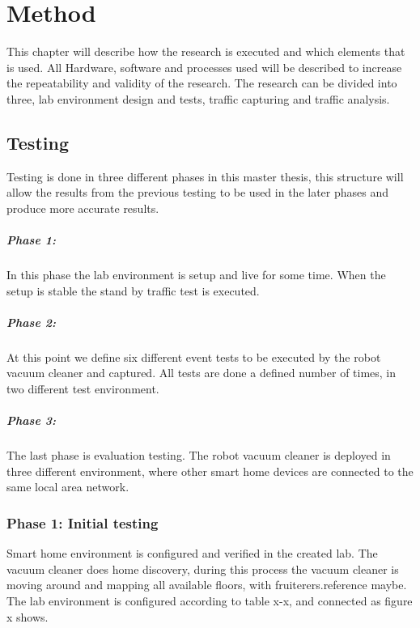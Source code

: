 \chapter*{Method}

This chapter will describe how the research is executed and which elements that is used. All Hardware, software and processes used will be described to increase the repeatability and validity of the research. The research can be divided into three, lab environment design and tests, traffic capturing and traffic analysis.

\section{Testing}
Testing is done in three different phases in this master thesis, this structure will allow the results from the previous testing to be used in the later phases and produce more accurate results.

    \paragraph{Phase 1: } In this phase the lab environment is setup and live for some time. When the setup is stable the stand by traffic test is executed. 

    \paragraph{Phase 2: } At this point we define six different event tests to be executed by the robot vacuum cleaner and captured. All tests are done a defined number of times, in two different test environment. 

    \paragraph{Phase 3: } The last phase is evaluation testing. The robot vacuum cleaner is deployed in three different environment, where other smart home devices are connected to the same local area network. 

\subsection{Phase 1: Initial testing}
Smart home environment is configured and verified in the created lab. The vacuum cleaner does home discovery, during this process the vacuum cleaner is moving around and mapping all available floors, with fruiterers.reference maybe. The lab environment is configured according to table x-x, and connected as figure x shows.

